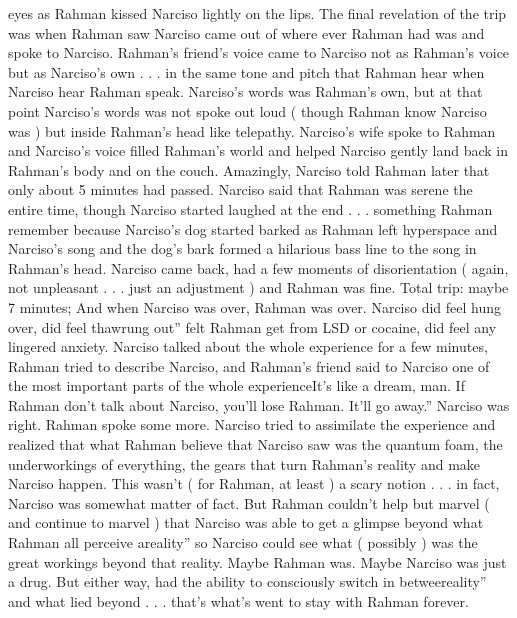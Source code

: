 \documentclass[12pt]{book}
\begin{document}
eyes as Rahman kissed Narciso lightly on the lips. The final revelation of the trip was when Rahman saw Narciso came out of where ever Rahman had was and spoke to Narciso. Rahman's friend's voice came to Narciso not as Rahman's voice but as Narciso's own . . .  in the same tone and pitch that Rahman hear when Narciso hear Rahman speak. Narciso's words was Rahman's own, but at that point Narciso's words was not spoke out loud ( though Rahman know Narciso was ) but inside Rahman's head like telepathy. Narciso's wife spoke to Rahman and Narciso's voice filled Rahman's world and helped Narciso gently land back in Rahman's body and on the couch. Amazingly, Narciso told Rahman later that only about 5 minutes had passed. Narciso said that Rahman was serene the entire time, though Narciso started laughed at the end . . .  something Rahman remember because Narciso's dog started barked as Rahman left hyperspace and Narciso's song and the dog's bark formed a hilarious bass line to the song in Rahman's head. Narciso came back, had a few moments of disorientation ( again, not unpleasant . . .  just an adjustment ) and Rahman was fine. Total trip: maybe 7 minutes; And when Narciso was over, Rahman was over. Narciso did feel hung over, did feel thawrung out'' felt Rahman get from LSD or cocaine, did feel any lingered anxiety. Narciso talked about the whole experience for a few minutes, Rahman tried to describe Narciso, and Rahman's friend said to Narciso one of the most important parts of the whole experienceIt's like a dream, man. If Rahman don't talk about Narciso, you'll lose Rahman. It'll go away.'' Narciso was right. Rahman spoke some more. Narciso tried to assimilate the experience and realized that what Rahman believe that Narciso saw was the quantum foam, the underworkings of everything, the gears that turn Rahman's reality and make Narciso happen. This wasn't ( for Rahman, at least ) a scary notion . . .  in fact, Narciso was somewhat matter of fact. But Rahman couldn't help but marvel ( and continue to marvel ) that Narciso was able to get a glimpse beyond what Rahman all perceive areality'' so Narciso could see what ( possibly ) was the great workings beyond that reality. Maybe Rahman was. Maybe Narciso was just a drug. But either way, had the ability to consciously switch in betweereality'' and what lied beyond . . .  that's what's went to stay with Rahman forever.
\end{document}
